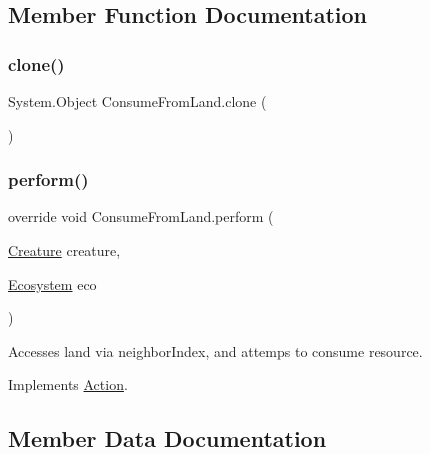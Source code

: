 \subsection{Member Function Documentation}
\mbox{\label{class_consume_from_land_a352f47add666c68f6ab9c901280b9de1}} 
\subsubsection{\texorpdfstring{clone()}{clone()}}
{\footnotesize\ttfamily System.\+Object Consume\+From\+Land.\+clone (\begin{DoxyParamCaption}{ }\end{DoxyParamCaption})}

\mbox{\label{class_consume_from_land_a05e266fe8dd4d68b7bec63f53a7f513b}} 
\subsubsection{\texorpdfstring{perform()}{perform()}}
{\footnotesize\ttfamily override void Consume\+From\+Land.\+perform (\begin{DoxyParamCaption}\item[{\mbox{\hyperlink{class_creature}{Creature}}}]{creature,  }\item[{\mbox{\hyperlink{class_ecosystem}{Ecosystem}}}]{eco }\end{DoxyParamCaption})\hspace{0.3cm}{\ttfamily [virtual]}}



Accesses land via neighbor\+Index, and attemps to consume resource. 



Implements \mbox{\hyperlink{class_action_a2aedfc3be16448fbf224cb13607de3c0}{Action}}.



\subsection{Member Data Documentation}
\mbox{\label{class_consume_from_land_a645ca79e901a05c787df9e35d3a0318b}} 
